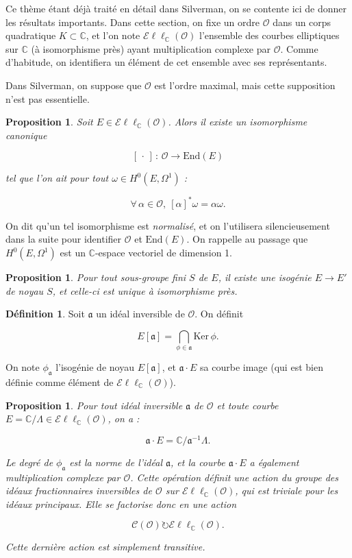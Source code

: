 \documentclass[11pt,a4paper]{article}
\newcommand{\C}{\mathbb{C}}
\renewcommand{\O}{\mathcal{O}}
\newcommand{\Cl}{\mathcal{C}}
\newcommand{\vers}{\rightarrow}
\newcommand{\End}{\mathrm{End}}
\newcommand{\Ell}{\mathcal{E}\ell\ell}
\renewcommand{\frak}{\mathfrak}
\newcommand{\de}{\,:\,}
\newtheorem{prop}[thm]{Proposition}
\theoremstyle{definition}
\newtheorem{defi}[thm]{Définition}
\begin{document}
Ce thème étant déjà traité en détail dans Silverman, on se contente ici de donner les résultats importants. Dans cette section, on fixe un ordre $\O$ dans un corps quadratique $K\subset \C$, et l'on note $\Ell_\C(\O)$ l'ensemble des courbes elliptiques sur $\C$ (à isomorphisme près) ayant multiplication complexe par $\O$. Comme d'habitude, on identifiera un élément de cet ensemble avec ses représentants.

Dans Silverman, on suppose que $\O$ est l'ordre maximal, mais cette supposition n'est pas essentielle.

\begin{prop}

Soit $E\in \Ell_\C(\O)$. Alors il existe un isomorphisme canonique

$$[\,\cdot\,]\de \O\vers \End(E)$$

tel que l'on ait pour tout $\omega\in H^0(E,\Omega^1)$ :

$$\forall\,\alpha\in\O,\ [\alpha]^*\omega = \alpha \omega.$$

\end{prop}

On dit qu'un tel isomorphisme est \emph{normalisé}, et on l'utilisera silencieusement dans la suite pour identifier $\O$ et $\End(E)$. On rappelle au passage que $H^0(E,\Omega^1)$ est un $\C$-espace vectoriel de dimension 1.

\begin{prop}
Pour tout sous-groupe fini $S$ de $E$, il existe une isogénie $E\vers E'$ de noyau $S$, et celle-ci est unique à isomorphisme près.
\end{prop}

\begin{defi}
Soit $\frak a$ un idéal inversible de $\O$. On définit

$$E[\frak a]=\bigcap_{\phi\in \frak a} \mathrm{Ker}\,\phi.$$

On note $\phi_{\frak a}$ l'isogénie de noyau $E[\frak a]$, et $\frak a\cdot E$ sa courbe image (qui est bien définie comme élément de $\Ell_\C(\O)$).
\end{defi}

\begin{prop}

Pour tout idéal inversible $\frak a$ de $\O$ et toute courbe $E=\C/\Lambda\in \Ell_\C(\O)$, on a :

$$\frak a\cdot E = \C/\frak a^{-1} \Lambda.$$

Le degré de $\phi_{\frak a}$ est la norme de l'idéal $\frak a$, et la courbe $\frak a\cdot E$ a également multiplication complexe par $\O$. Cette opération définit une action du groupe des idéaux fractionnaires inversibles de $\O$ sur $\Ell_\C(\O)$, qui est triviale pour les idéaux principaux. Elle se factorise donc en une action

$$\Cl(\O) \circlearrowright \Ell_\C(\O).$$

Cette dernière action est simplement transitive.

\end{prop}
\end{document}
